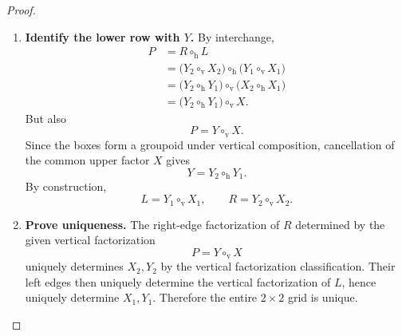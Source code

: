 \documentclass[oneside]{article}
\theoremstyle{plain}
\theoremstyle{definition}
\theoremstyle{remark}
\begin{document}
\begin{proof}
\begin{enumerate}[beginpenalty=10000]
        \item \textbf{Identify the lower row with \(Y\).}
        By interchange,
        \begin{align*}
            P
            &=
            R\circ_{\mathrm h}L
            \\
            &=
            \bigl(
                Y_2\circ_{\mathrm v}X_2
            \bigr)
            \circ_{\mathrm h}
            \bigl(
                Y_1\circ_{\mathrm v}X_1
            \bigr)
            \\
            &=
            \bigl(
                Y_2\circ_{\mathrm h}Y_1
            \bigr)
            \circ_{\mathrm v}
            \bigl(
                X_2\circ_{\mathrm h}X_1
            \bigr)
            \\
            &=
            \bigl(
                Y_2\circ_{\mathrm h}Y_1
            \bigr)
            \circ_{\mathrm v}X.
        \end{align*}
        But also
        \[
            P=Y\circ_{\mathrm v}X.
        \]
        Since the boxes form a groupoid under vertical composition,
        cancellation of the common upper factor \(X\) gives
        \[
            Y=Y_2\circ_{\mathrm h}Y_1.
        \]
        By construction,
        \[
            L=Y_1\circ_{\mathrm v}X_1,
            \qquad
            R=Y_2\circ_{\mathrm v}X_2.
        \]

        \item \textbf{Prove uniqueness.}
        The right-edge factorization of \(R\) determined by the given
        vertical factorization
        \[
            P=Y\circ_{\mathrm v}X
        \]
        uniquely determines \(X_2,Y_2\) by the vertical factorization
        classification. Their left edges then uniquely determine the
        vertical factorization of \(L\), hence uniquely determine
        \(X_1,Y_1\). Therefore the entire \(2\times2\) grid is unique. \qedhere
    \end{enumerate}
\end{proof}
\end{document}
